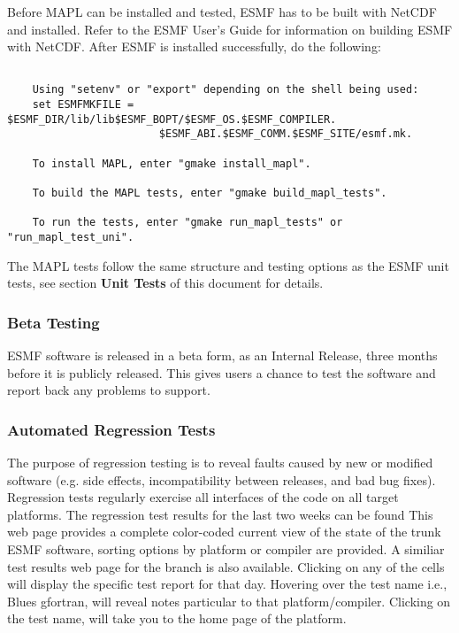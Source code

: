 Before MAPL can be installed and tested, ESMF has to be built with NetCDF and installed.
Refer to the ESMF User's Guide for information on building
ESMF with NetCDF. After ESMF is installed successfully, do the following:
\begin{verbatim}

	Using "setenv" or "export" depending on the shell being used:
	set ESMFMKFILE = $ESMF_DIR/lib/lib$ESMF_BOPT/$ESMF_OS.$ESMF_COMPILER.
                        $ESMF_ABI.$ESMF_COMM.$ESMF_SITE/esmf.mk.

	To install MAPL, enter "gmake install_mapl".

	To build the MAPL tests, enter "gmake build_mapl_tests".

	To run the tests, enter "gmake run_mapl_tests" or "run_mapl_test_uni".

\end{verbatim}

The MAPL tests follow the same structure and testing options as
the ESMF unit tests, see section {\bf Unit Tests} of this document for details.

\subsubsection{Beta Testing}

ESMF software is released in a beta form, as an Internal Release,
three months before it is publicly released.  This gives users
a chance to test the software and report back any problems to 
support.

\subsubsection{Automated Regression Tests}

The purpose of regression testing is to reveal faults caused by new
or modified software (e.g. side effects, incompatibility between 
releases, and bad bug fixes).  
Regression tests regularly exercise all interfaces of the code on 
all target platforms.  
The regression test results for the last two weeks can be found 
This web page provides a complete color-coded current view of the state of the trunk ESMF software, sorting options by platform or compiler are provided.
A similiar test results web page for the branch is also available.
Clicking on any of the cells will display the specific test report for that day.
Hovering over the test name i.e., Blues gfortran, will reveal notes particular to that platform/compiler. Clicking on the test name, will take you to the home page of the platform. 

